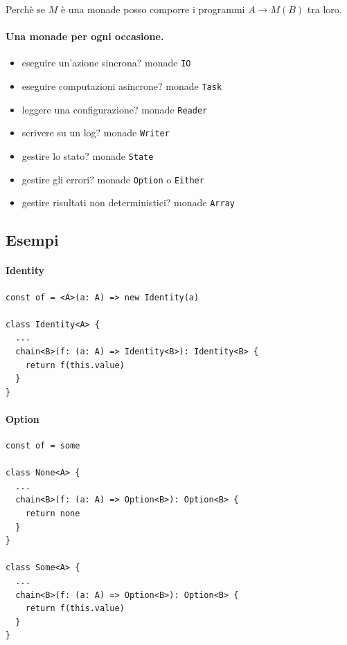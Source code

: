 \documentclass[12pt]{article}
\begin{document}
Perchè se $M$ è una monade posso comporre i programmi $A \rightarrow M(B)$ tra loro.

\paragraph{Una monade per ogni occasione.}

\begin{itemize}
  \item eseguire un'azione sincrona? monade \texttt{IO}
  \item eseguire computazioni asincrone? monade \texttt{Task}
  \item leggere una configurazione? monade \texttt{Reader}
  \item scrivere su un log? monade \texttt{Writer}
  \item gestire lo stato? monade \texttt{State}
  \item gestire gli errori? monade \texttt{Option} o \texttt{Either}
  \item gestire risultati non deterministici? monade \texttt{Array}
\end{itemize}

\subsection{Esempi}

\paragraph{Identity}

\begin{verbatim}
const of = <A>(a: A) => new Identity(a)

class Identity<A> {
  ...
  chain<B>(f: (a: A) => Identity<B>): Identity<B> {
    return f(this.value)
  }
}
\end{verbatim}

\paragraph{Option}

\begin{verbatim}
const of = some

class None<A> {
  ...
  chain<B>(f: (a: A) => Option<B>): Option<B> {
    return none
  }
}

class Some<A> {
  ...
  chain<B>(f: (a: A) => Option<B>): Option<B> {
    return f(this.value)
  }
}
\end{verbatim}
\end{document}
